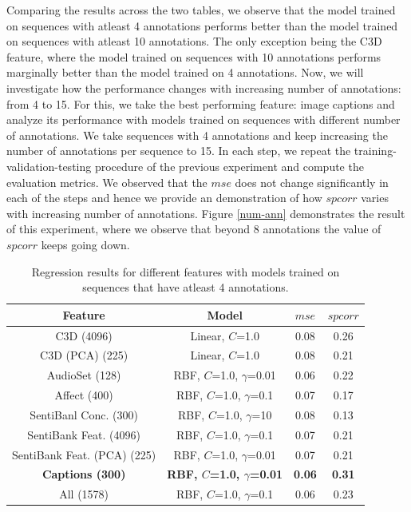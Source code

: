 \documentclass[sigconf]{acmart}
\begin{document}
Comparing the results across the two tables, we observe that the model trained on sequences with atleast 4 annotations performs better than the model trained on sequences with atleast 10 annotations.
The only exception being the C3D feature, where the model trained on sequences with 10 annotations performs marginally better than the model trained on 4 annotations. 
Now, we will investigate how the performance changes with increasing number of annotations: from 4 to 15.
For this, we take the best performing feature: image captions and analyze its performance with models trained on sequences with different number of annotations.
We take sequences with 4 annotations and keep increasing the number of annotations per sequence to 15.
In each step, we repeat the training-validation-testing procedure of the previous experiment and compute the evaluation metrics.
We observed that the $mse$ does not change significantly in each of the steps and hence we provide an demonstration of how $spcorr$ varies with increasing number of annotations.
Figure \ref{num-ann} demonstrates the result of this experiment, where we observe that beyond 8 annotations the value of $spcorr$ keeps going down.

\begin{table}[!ht]
\centering
    \begin{tabular}{| c | c | c | c |}
    \hline
				Feature& Model& $mse$& $spcorr$\\ \hline
				C3D (4096)& Linear, $C$=1.0& 0.08& 0.26\\ \hline
				C3D (PCA) (225)& Linear, $C$=1.0& 0.08& 0.21\\ \hline
				AudioSet (128)& RBF, $C$=1.0, $\gamma$=0.01& 0.06& 0.22\\ \hline
				Affect (400)& RBF, $C$=1.0, $\gamma$=0.1& 0.07& 0.17\\ \hline
				SentiBanl Conc. (300)& RBF, $C$=1.0, $\gamma$=10& 0.08& 0.13\\ \hline
				SentiBank Feat. (4096)& RBF, $C$=1.0, $\gamma$=0.1& 0.07& 0.21\\ \hline
				SentiBank Feat. (PCA) (225)& RBF, $C$=1.0, $\gamma$=0.01& 0.07& 0.21\\ \hline
				\textbf{Captions (300)}& \textbf{RBF, $C$=1.0, $\gamma$=0.01}& \textbf{0.06}& \textbf{0.31}\\ \hline
				All (1578)& RBF, $C$=1.0, $\gamma$=0.1& 0.06& 0.23\\ \hline
    \end{tabular}		
		\caption{Regression results for different features with models trained on sequences that have atleast 4 annotations.}
		\label{res-4-ann}	
\end{table}
\end{document}
